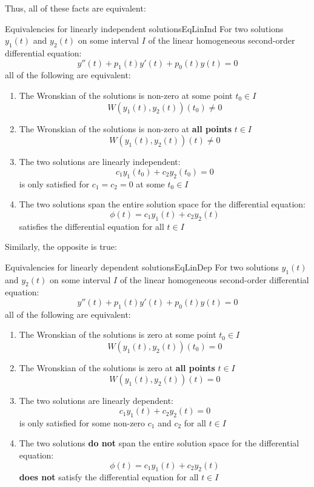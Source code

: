 \documentclass{report}
\begin{document}
Thus, all of these facts are equivalent:

\begin{mytheo}{Equivalencies for linearly independent solutions}{EqLinInd}
    For two solutions $y_1(t)$ and $y_2(t)$ on some interval $I$ of the linear homogeneous second-order differential equation:
    $$y''(t) + p_1(t)y'(t) + p_0(t)y(t) = 0$$
    all of the following are equivalent:
    \begin{enumerate}
        \item The Wronskian of the solutions is non-zero at some point $t_0 \in I$ 
        $$W(y_1(t), y_2(t))(t_0) \neq 0 $$
        \item The Wronskian of the solutions is non-zero at \textbf{all points} $t \in I$ 
        $$W(y_1(t), y_2(t))(t) \neq 0 $$
        \item The two solutions are linearly independent:
        $$c_1y_1(t_0) + c_2y_2(t_0) = 0$$
        is only satisfied for $c_1=c_2=0$ at some $t_0 \in I$
        \item The two solutions span the entire solution space for the differential equation:
        $$\phi(t) = c_1y_1(t) + c_2y_2(t)$$
        satisfies the differential equation for all $t \in I$
    
    \end{enumerate}
    
\end{mytheo}


Similarly, the opposite is true:

\begin{mytheo}{Equivalencies for linearly dependent solutions}{EqLinDep}
    For two solutions $y_1(t)$ and $y_2(t)$ on some interval $I$ of the linear homogeneous second-order differential equation:
    $$y''(t) + p_1(t)y'(t) + p_0(t)y(t) = 0$$
    all of the following are equivalent:
    \begin{enumerate}
        \item The Wronskian of the solutions is zero at some point $t_0 \in I$ 
        $$W(y_1(t), y_2(t))(t_0) = 0 $$
        \item The Wronskian of the solutions is zero at \textbf{all points} $t \in I$ 
        $$W(y_1(t), y_2(t))(t) = 0 $$
        \item The two solutions are linearly dependent:
        $$c_1y_1(t) + c_2y_2(t) = 0$$
        is only satisfied for some non-zero $c_1$ and $c_2$ for all $t \in I$
        \item The two solutions \textbf{do not} span the entire solution space for the differential equation:
        $$\phi(t) = c_1y_1(t) + c_2y_2(t)$$
        \textbf{does not} satisfy the differential equation for all $t \in I$
    
    \end{enumerate}
    
\end{mytheo}
\end{document}
